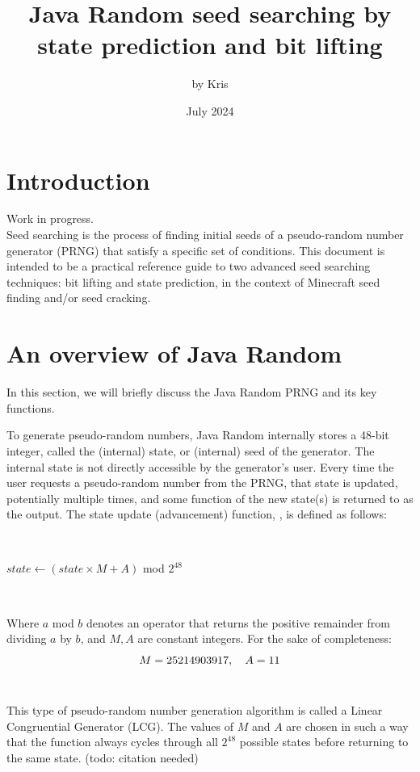 \documentclass{article}
\title{Java Random seed searching by state prediction and bit lifting}
\author{by Kris}
\date{July 2024}
\begin{document}
\maketitle

\section{Introduction}
Work in progress.\\
Seed searching is the process of finding initial seeds of a pseudo-random number generator (PRNG) that satisfy a specific set of conditions.
This document is intended to be a practical reference guide to two advanced seed searching techniques: bit lifting and state prediction, in the context of Minecraft seed finding and/or seed cracking.

\section{An overview of Java Random}
In this section, we will briefly discuss the Java Random PRNG and its key functions.

To generate pseudo-random numbers, Java Random internally stores a 48-bit integer, called the (internal) state, or (internal) seed of the generator. The internal state is not directly accessible by the generator’s user. Every time the user requests a pseudo-random number from the PRNG, that state is updated, potentially multiple times, and some function of the new state(s) is returned to as the output. The state update (advancement) function, , is defined as follows:

\
\begin{algorithmic}
    \State $state \gets (state \times M + A)$ mod $2^{48}$
\EndFunction
\end{algorithmic}
\ \

\noindent Where $a$ mod $b$ denotes an operator that returns the positive remainder from dividing $a$ by $b$, and $M, A$ are constant integers. For the sake of completeness:
\begin{equation}\notag
    M = 25214903917, \quad A = 11
\end{equation}
\ \

This type of pseudo-random number generation algorithm is called a Linear Congruential Generator (LCG). The values of $M$ and $A$ are chosen in such a way that the  function always cycles through all $2^{48}$ possible states before returning to the same state. (todo: citation needed)
\end{document}
